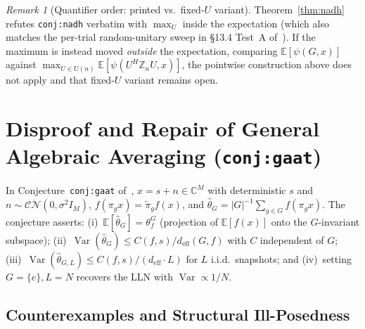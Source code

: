 \documentclass[11pt]{article}
\theoremstyle{plain}
\theoremstyle{definition}
\theoremstyle{remark}
\newtheorem{remark}{Remark}
\DeclareMathOperator{\Var}{Var}
\begin{document}
\begin{remark}[Quantifier order: printed vs.\ fixed-$U$ variant]
Theorem~\ref{thm:nadh} refutes \texttt{conj:nadh} verbatim with $\max_U$ inside the expectation (which also matches the per-trial random-unitary sweep in \S 13.4 Test~A of~\cite{Thornton2026}). If the maximum is instead moved \emph{outside} the expectation, comparing $\mathbb{E}[\psi(G, x)]$ against $\max_{U \in U(n)} \mathbb{E}[\psi(U^H \mathbb{Z}_n U, x)]$, the pointwise construction above does not apply and that fixed-$U$ variant remains open.
\end{remark}

\section{Disproof and Repair of General Algebraic Averaging (\texttt{conj:gaat})}

In Conjecture~\texttt{conj:gaat} of~\cite{Thornton2026}, $x = s + n \in \mathbb{C}^M$ with deterministic $s$ and $n \sim \mathcal{CN}(0, \sigma^2 I_M)$, $f(\pi_g x) = \tilde{\pi}_g f(x)$, and $\hat{\theta}_G = |G|^{-1}\sum_{g \in G} f(\pi_g x)$. The conjecture asserts: (i)~$\mathbb{E}[\hat{\theta}_G] = \theta_f^G$ (projection of $\mathbb{E}[f(x)]$ onto the $G$-invariant subspace); (ii)~$\Var(\hat{\theta}_G) \le C(f, s)/d_{\mathrm{eff}}(G, f)$ with $C$ independent of $G$; (iii)~$\Var(\hat{\theta}_{G, L}) \le C(f, s)/(d_{\mathrm{eff}}\cdot L)$ for $L$ i.i.d.\ snapshots; and (iv)~setting $G = \{e\}, L = N$ recovers the LLN with $\Var \propto 1/N$.

\subsection{Counterexamples and Structural Ill-Posedness}
\end{document}
